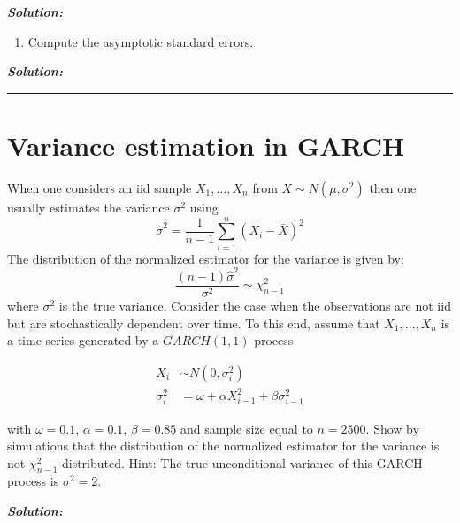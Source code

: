 \documentclass[]{article}
\providecommand{\tightlist}{%
  \setlength{\itemsep}{0pt}\setlength{\parskip}{0pt}}
\begin{document}
\textbf{\emph{Solution:}}

\begin{enumerate}
\def\labelenumi{\arabic{enumi}.}
\setcounter{enumi}{2}
\tightlist
\item
  Compute the asymptotic standard errors.
\end{enumerate}

\textbf{\emph{Solution:}}

\pagebreak

\begin{center}\rule{0.5\linewidth}{\linethickness}\end{center}

\section{Variance estimation in
GARCH}\label{variance-estimation-in-garch}

When one considers an iid sample \(X_{1},\ldots ,X_{n}\) from
\(X\sim N(\mu ,\sigma ^{2})\) then one usually estimates the variance
\(\sigma^{2}\) using \[
\hat{\sigma}^{2}=\frac{1}{n-1}\sum_{i=1}^{n}(X_{i}-\bar{X})^{2}
\] The distribution of the normalized estimator for the variance is
given by: \[
\frac{\left( n-1\right) \hat{\sigma}^{2}}{\sigma ^{2}}\sim \chi _{n-1}^{2}
\] where \(\sigma^2\) is the true variance. Consider the case when the
observations are not iid but are stochastically dependent over time. To
this end, assume that \(X_{1},\ldots ,X_{n}\) is a time series generated
by a \(GARCH(1,1)\) process

\begin{align*}
X_{i} &\sim N(0,\sigma _{i}^{2}) \\
\sigma _{i}^{2} &=\omega +\alpha X_{i-1}^{2}+\beta \sigma _{i-1}^{2}
\end{align*}

with \(\omega =0.1\), \(\alpha =0.1\), \(\beta =0.85\) and sample size
equal to \(n=2500\). Show by simulations that the distribution of the
normalized estimator for the variance is not
\(\chi^2_{n-1}\)-distributed. Hint: The true unconditional variance of
this GARCH process is \(\sigma^{2}=2\).

\textbf{\emph{Solution:}}
\end{document}
